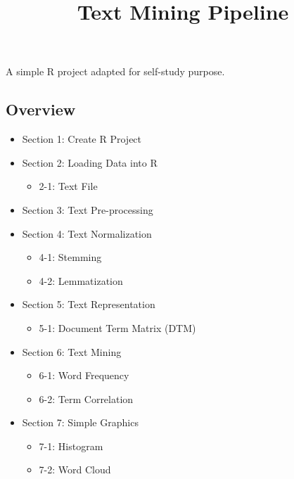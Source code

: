 \documentclass[
]{article}
\title{Text Mining Pipeline}
\author{}
\date{\vspace{-2.5em}}
\providecommand{\tightlist}{%
  \setlength{\itemsep}{0pt}\setlength{\parskip}{0pt}}
\begin{document}
\maketitle

A simple R project adapted for self-study purpose.

\hypertarget{overview}{%
\subsection{Overview}\label{overview}}

\begin{itemize}
\tightlist
\item
  Section 1: Create R Project
\item
  Section 2: Loading Data into R

  \begin{itemize}
  \tightlist
  \item
    2-1: Text File
  \end{itemize}
\item
  Section 3: Text Pre-processing
\item
  Section 4: Text Normalization

  \begin{itemize}
  \tightlist
  \item
    4-1: Stemming
  \item
    4-2: Lemmatization
  \end{itemize}
\item
  Section 5: Text Representation

  \begin{itemize}
  \tightlist
  \item
    5-1: Document Term Matrix (DTM)
  \end{itemize}
\item
  Section 6: Text Mining

  \begin{itemize}
  \tightlist
  \item
    6-1: Word Frequency
  \item
    6-2: Term Correlation
  \end{itemize}
\item
  Section 7: Simple Graphics

  \begin{itemize}
  \tightlist
  \item
    7-1: Histogram
  \item
    7-2: Word Cloud
  \end{itemize}
\end{itemize}
\end{document}
